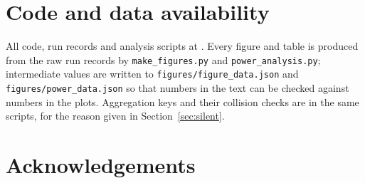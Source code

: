 \documentclass[11pt,onecolumn]{article}
\newif\ifdraft
\newcommand{\pend}[1]{%
  \ifdraft\textcolor{PendFG}{\textbf{[}\textit{#1}\textbf{]}}\fi}
\begin{document}
\section*{Code and data availability}
All code, run records and analysis scripts at \pend{repository URL and
archival DOI}. Every figure and table is produced from the raw run
records by \texttt{make\_figures.py} and \texttt{power\_analysis.py};
intermediate values are written to \texttt{figures/figure\_data.json}
and \texttt{figures/power\_data.json} so that numbers in the text can be
checked against numbers in the plots. Aggregation keys and their
collision checks are in the same scripts, for the reason given in
Section~\ref{sec:silent}.

\section*{Acknowledgements}
\pend{acknowledgements, funding, hardware access}

\appendix
\end{document}
